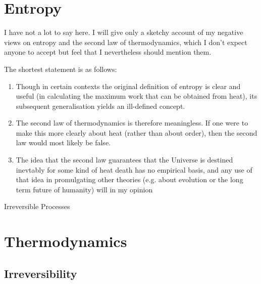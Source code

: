 \documentclass[10pt,titlepage]{book}
\newcommand{\ignore}[1]{}
\begin{document}
\section{Entropy}

I have not a lot to say here.
I will give only a sketchy account of my negative views on entropy and the second law of thermodynamics, which I don't expect anyone to accept but feel that I nevertheless should mention them.

The shortest statement is as follows:
\begin{enumerate}

\item Though in certain contexts the original definition of entropy is clear and useful (in calculating the maximum work that can be obtained from heat), its subsequent generalisation yields an ill-defined concept.
\item The second law of thermodynamics is therefore meaningless.
  If one were to make this more clearly about heat (rather than about order), then the second law would most likely be false.
  \item The idea that the second law guarantees that the Universe is destined inevtably for some kind of heat death has no empirical basis, and any use of that idea in promulgating other theories (e.g. about evolution or the long term future of humanity) will in my opinion 
\end{enumerate}


\begin{description}
\item[Irreversible Processes]
  \item[]
  \item[]
  \item[]
  \item[]
  \item[]
\end{description}

\section{Thermodynamics}

\subsection{Irreversibility}
\ignore{
  Do the facts about entropy go beyond what is found in Newtonian physics or are they derivable from them?
  Is the Second Law a physical theory or a statistical one?
  How, if ever, does entropy increase?
  Are there absolutely irreversible processes?
}%
\end{document}
